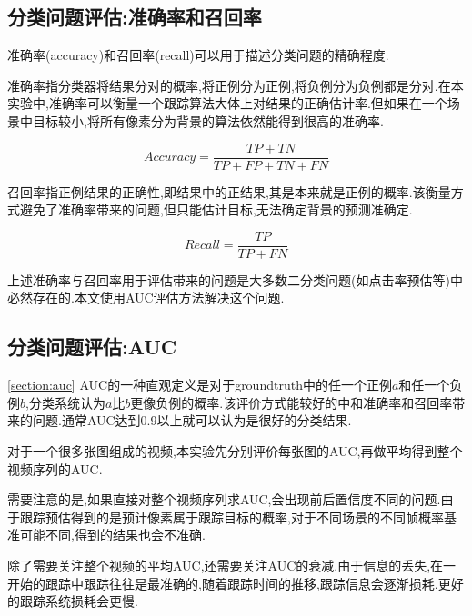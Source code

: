 \subsection{分类问题评估:准确率和召回率}
准确率(accuracy)和召回率(recall)可以用于描述分类问题的精确程度.
\par
准确率指分类器将结果分对的概率,将正例分为正例,将负例分为负例都是分对.在本实验中,准确率可以衡量一个跟踪算法大体上对结果的正确估计率.但如果在一个场景中目标较小,将所有像素分为背景的算法依然能得到很高的准确率.
\par
\begin{equation}\label{equ:accuracy}  Accuracy=\frac{TP+TN}{TP+FP+TN+FN}  \end{equation}
\par
召回率指正例结果的正确性,即结果中的正结果,其是本来就是正例的概率.该衡量方式避免了准确率带来的问题,但只能估计目标,无法确定背景的预测准确定.
\par
\begin{equation}\label{equ:recall}  Recall=\frac{TP}{TP+FN}  \end{equation}
\par
上述准确率与召回率用于评估带来的问题是大多数二分类问题(如点击率预估等)中必然存在的.本文使用AUC评估方法解决这个问题.

\subsection{分类问题评估:AUC} \ref{section:auc}
AUC的一种直观定义是对于groundtruth中的任一个正例$a$和任一个负例$b$,分类系统认为$a$比$b$更像负例的概率.该评价方式能较好的中和准确率和召回率带来的问题.通常AUC达到0.9以上就可以认为是很好的分类结果.
\par
对于一个很多张图组成的视频,本实验先分别评价每张图的AUC,再做平均得到整个视频序列的AUC.
\par
需要注意的是,如果直接对整个视频序列求AUC,会出现前后置信度不同的问题.由于跟踪预估得到的是预计像素属于跟踪目标的概率,对于不同场景的不同帧概率基准可能不同,得到的结果也会不准确.
\par
除了需要关注整个视频的平均AUC,还需要关注AUC的衰减.由于信息的丢失,在一开始的跟踪中跟踪往往是最准确的,随着跟踪时间的推移,跟踪信息会逐渐损耗.更好的跟踪系统损耗会更慢.
